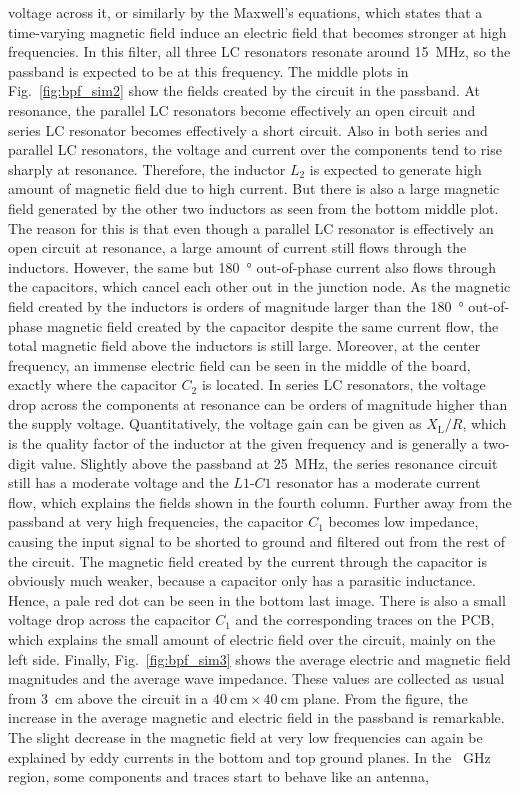 voltage across it, or similarly by the Maxwell's equations, which states that a time-varying magnetic field induce an electric field that becomes stronger at high frequencies. In this filter, all three LC resonators resonate around \SI{15}{\mega\hertz}, so the passband is expected to be at this frequency. The middle plots in Fig.~\ref{fig:bpf_sim2} show the fields created by the circuit in the passband. At resonance, the parallel LC resonators become effectively an open circuit and series LC resonator becomes effectively a short circuit. Also in both series and parallel LC resonators, the voltage and current over the components tend to rise sharply at resonance. Therefore, the inductor $L_2$ is expected to generate high amount of magnetic field due to high current. But there is also a large magnetic field generated by the other two inductors as seen from the bottom middle plot. The reason for this is that even though a parallel LC resonator is effectively an open circuit at resonance, a large amount of current still flows through the inductors. However, the same but \SI{180}{\degree} out-of-phase current also flows through the capacitors, which cancel each other out in the junction node. As the magnetic field created by the inductors is orders of magnitude larger than the \SI{180}{\degree} out-of-phase magnetic field created by the capacitor despite the same current flow, the total magnetic field above the inductors is still large. Moreover, at the center frequency, an immense electric field can be seen in the middle of the board, exactly where the capacitor $C_2$ is located. In series LC resonators, the voltage drop across the components at resonance can be orders of magnitude higher than the supply voltage. Quantitatively, the voltage gain can be given as $X_\mathrm{L}/R$, which is the quality factor of the inductor at the given frequency and is generally a two-digit value. Slightly above the passband at \SI{25}{\mega\hertz}, the series resonance circuit still has a moderate voltage and the $L1$-$C1$ resonator has a moderate current flow, which explains the fields shown in the fourth column. Further away from the passband at very high frequencies, the capacitor $C_1$ becomes low impedance, causing the input signal to be shorted to ground and filtered out from the rest of the circuit. The magnetic field created by the current through the capacitor is obviously much weaker, because a capacitor only has a parasitic inductance. Hence, a pale red dot can be seen in the bottom last image. There is also a small voltage drop across the capacitor $C_1$ and the corresponding traces on the PCB, which explains the small amount of electric field over the circuit, mainly on the left side. Finally, Fig.~\ref{fig:bpf_sim3} shows the average electric and magnetic field magnitudes and the average wave impedance. These values are collected as usual from \SI{3}{\centi\meter} above the circuit in a $\SI{40}{\centi\meter} \times \SI{40}{\centi\meter}$ plane. From the figure, the increase in the average magnetic and electric field in the passband is remarkable. The slight decrease in the magnetic field at very low frequencies can again be explained by eddy currents in the bottom and top ground planes. In the \SI{}{\giga\hertz} region, some components and traces start to behave like an antenna, 